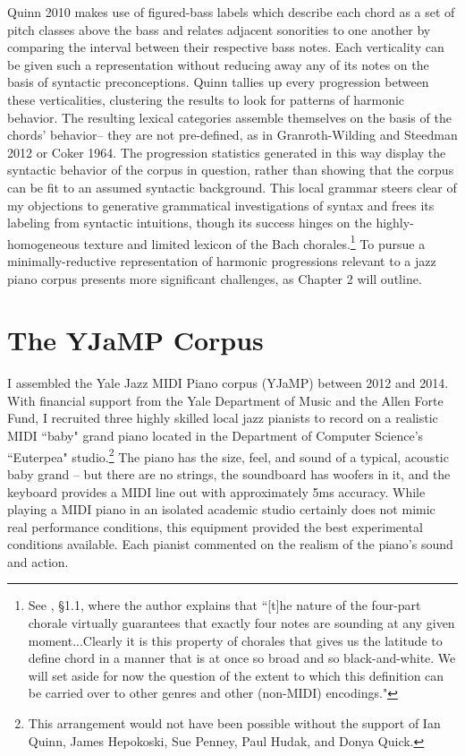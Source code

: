 Quinn 2010 makes use of figured-bass labels which describe each chord as a set of pitch classes above the bass and relates adjacent sonorities to one another by comparing the interval between their respective bass notes.  Each verticality can be given such a representation without reducing away any of its notes on the basis of syntactic preconceptions.  Quinn tallies up every progression between these verticalities, clustering the results to look for patterns of harmonic behavior.  The resulting lexical categories assemble themselves on the basis of the chords' behavior-- they are not pre-defined, as in Granroth-Wilding and Steedman 2012 or Coker 1964.  The progression statistics generated in this way display the syntactic behavior of the corpus in question, rather than showing that the corpus can be fit to an assumed syntactic background.  This local grammar steers clear of my objections to generative grammatical investigations of syntax and frees its labeling from syntactic intuitions, though its success hinges on the highly-homogeneous texture and limited lexicon of the Bach chorales.\footnote{See \cite{quinn2010}, \S 1.1, where the author explains that ``[t]he nature of the four-part chorale virtually guarantees that exactly four notes are sounding at any given moment...Clearly it is this property of chorales that gives us the latitude to define chord in a manner that is at once so broad and so black-and-white. We will set aside for now the question of the extent to which this definition can be carried over to other genres and other (non-MIDI) encodings."}  To pursue a minimally-reductive representation of harmonic progressions relevant to a jazz piano corpus presents more significant challenges, as Chapter 2 will outline.

\section{The YJaMP Corpus}

I assembled the Yale Jazz MIDI Piano corpus (YJaMP) between 2012 and 2014.  With financial support from the Yale Department of Music and the Allen Forte Fund, I recruited three highly skilled local jazz pianists to record on a realistic MIDI ``baby" grand piano located in the Department of Computer Science's ``Euterpea" studio.\footnote{This arrangement would not have been possible without the support of Ian Quinn, James Hepokoski, Sue Penney, Paul Hudak, and Donya Quick.}  The piano has the size, feel, and sound of a typical, acoustic baby grand -- but there are no strings, the soundboard has woofers in it, and the keyboard provides a MIDI line out with approximately 5ms accuracy.  While playing a MIDI piano in an isolated academic studio certainly does not mimic real performance conditions, this equipment provided the best experimental conditions available.  Each pianist commented on the realism of the piano's sound and action.

